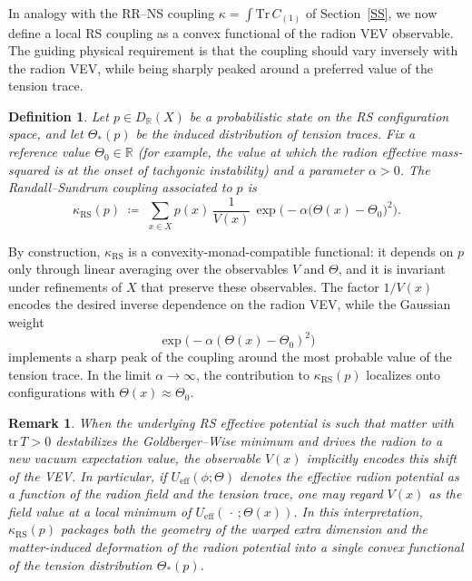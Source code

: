 \documentclass{article}
\newtheorem{dn}{Definition}
\newtheorem{rk}{Remark}
\numberwithin{tm}{section}
\numberwithin{dn}{section}
\numberwithin{as}{section}
\numberwithin{rk}{section}
\numberwithin{lem}{section}
\numberwithin{ax}{section}
\numberwithin{pp}{section}
\numberwithin{eg}{section}
\numberwithin{war}{section}
\numberwithin{equation}{section}
\numberwithin{prop}{section}
\numberwithin{nt}{section}
\numberwithin{rc}{section}
\numberwithin{setup}{section}
\begin{document}
	In analogy with the RR--NS coupling $\kappa = \int \mathrm{Tr}\,C_{(1)}$ of Section~\ref{SS}, we now define a local RS coupling as a convex functional of the radion VEV observable. The guiding physical requirement is that the coupling should vary inversely with the radion VEV, while being sharply peaked around a preferred value of the tension trace.
	
	\begin{dn}
		Let $p \in D_{\mathbb{R}}(X)$ be a probabilistic state on the RS configuration space, and let $\Theta_*(p)$ be the induced distribution of tension traces. Fix a reference value $\Theta_0 \in \mathbb{R}$ (for example, the value at which the radion effective mass-squared is at the onset of tachyonic instability) and a parameter $\alpha > 0$. The \emph{Randall--Sundrum coupling} associated to $p$ is
		\begin{equation}
			\kappa_{\mathrm{RS}}(p)
			\;\coloneq\;
			\sum_{x \in X} p(x)\, \frac{1}{V(x)} \,
			\exp\!\bigl(-\alpha \bigl(\Theta(x) - \Theta_0\bigr)^2\bigr).
		\end{equation}
	\end{dn}
	
	By construction, $\kappa_{\mathrm{RS}}$ is a convexity-monad-compatible functional: it depends on $p$ only through linear averaging over the observables $V$ and $\Theta$, and it is invariant under refinements of $X$ that preserve these observables. The factor $1/V(x)$ encodes the desired inverse dependence on the radion VEV, while the Gaussian weight
	\[
	\exp\!\bigl(-\alpha (\Theta(x) - \Theta_0)^2\bigr)
	\]
	implements a sharp peak of the coupling around the most probable value of the tension trace. In the limit $\alpha \to \infty$, the contribution to $\kappa_{\mathrm{RS}}(p)$ localizes onto configurations with $\Theta(x) \approx \Theta_0$.
	
	\begin{rk}
		When the underlying RS effective potential is such that matter with $\mathrm{tr}\,T > 0$ destabilizes the Goldberger--Wise minimum and drives the radion to a new vacuum expectation value, the observable $V(x)$ implicitly encodes this shift of the VEV. In particular, if $U_{\mathrm{eff}}(\phi;\Theta)$ denotes the effective radion potential as a function of the radion field and the tension trace, one may regard $V(x)$ as the field value at a local minimum of $U_{\mathrm{eff}}(\,\cdot\,;\Theta(x))$. In this interpretation, $\kappa_{\mathrm{RS}}(p)$ packages both the geometry of the warped extra dimension and the matter-induced deformation of the radion potential into a single convex functional of the tension distribution $\Theta_*(p)$.
	\end{rk}
	
\end{document}

